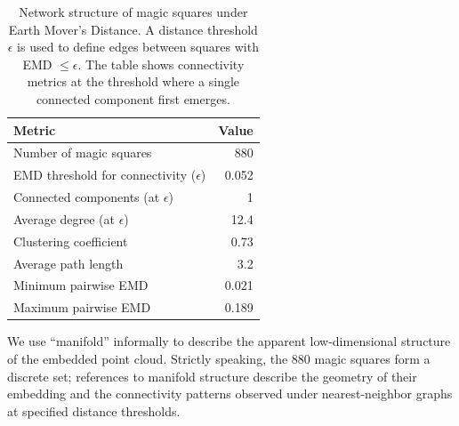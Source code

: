 \begin{table}[H]
\caption{Network structure of magic squares under Earth Mover's Distance. A distance threshold $\epsilon$ is used to define edges between squares with EMD $\leq \epsilon$. The table shows connectivity metrics at the threshold where a single connected component first emerges.}
\label{tab:manifold}
\begin{tabular}{lr}
\toprule
Metric & Value \\
\midrule
Number of magic squares & 880 \\
EMD threshold for connectivity ($\epsilon$) & 0.052 \\
Connected components (at $\epsilon$) & 1 \\
Average degree (at $\epsilon$) & 12.4 \\
Clustering coefficient & 0.73 \\
Average path length & 3.2 \\
Minimum pairwise EMD & 0.021 \\
Maximum pairwise EMD & 0.189 \\
\bottomrule
\end{tabular}
\end{table}

\begin{remark}
We use ``manifold'' informally to describe the apparent low-dimensional structure of the embedded point cloud. Strictly speaking, the 880 magic squares form a discrete set; references to manifold structure describe the geometry of their embedding and the connectivity patterns observed under nearest-neighbor graphs at specified distance thresholds.
\end{remark}
